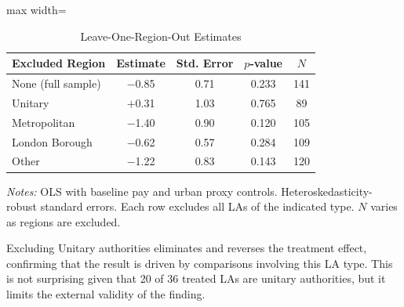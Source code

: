 \documentclass[12pt]{article}
\begin{document}
\begin{table}[H]
\centering
\caption{Leave-One-Region-Out Estimates}
\label{tab:loo}
\begin{adjustbox}{max width=\textwidth}
\begin{threeparttable}
\begin{tabular}{lcccc}
\toprule
Excluded Region & Estimate & Std. Error & $p$-value & $N$ \\
\midrule
None (full sample) & $-$0.85 & 0.71 & 0.233 & 141 \\
Unitary & $+$0.31 & 1.03 & 0.765 & 89 \\
Metropolitan & $-$1.40 & 0.90 & 0.120 & 105 \\
London Borough & $-$0.62 & 0.57 & 0.284 & 109 \\
Other & $-$1.22 & 0.83 & 0.143 & 120 \\
\bottomrule
\end{tabular}
\begin{tablenotes}[flushleft]
\small
\item \textit{Notes:} OLS with baseline pay and urban proxy controls. Heteroskedasticity-robust standard errors. Each row excludes all LAs of the indicated type. $N$ varies as regions are excluded.
\end{tablenotes}
\end{threeparttable}
\end{adjustbox}
\end{table}

Excluding Unitary authorities eliminates and reverses the treatment effect, confirming that the result is driven by comparisons involving this LA type. This is not surprising given that 20 of 36 treated LAs are unitary authorities, but it limits the external validity of the finding.
\end{document}
